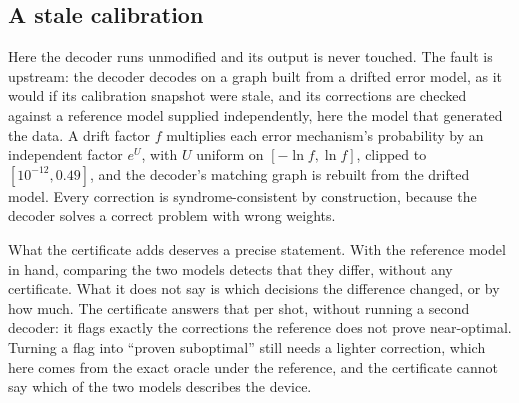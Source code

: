 \documentclass[aps,pra,twocolumn,superscriptaddress,nofootinbib,longbibliography,floatfix]{revtex4-2}
\newcommand{\eps}{\varepsilon}
\begin{document}
\subsection{A stale calibration}

Here the decoder runs unmodified and its output is never touched. The fault is upstream: the decoder decodes on a graph built from a drifted error model, as it would if its calibration snapshot were stale, and its corrections are checked against a reference model supplied independently, here the model that generated the data. A drift factor $f$ multiplies each error mechanism's probability by an independent factor $e^{U}$, with $U$ uniform on $[-\ln f,\ln f]$, clipped to $[10^{-12},0.49]$, and the decoder's matching graph is rebuilt from the drifted model. Every correction is syndrome-consistent by construction, because the decoder solves a correct problem with wrong weights.

What the certificate adds deserves a precise statement. With the reference model in hand, comparing the two models detects that they differ, without any certificate. What it does not say is which decisions the difference changed, or by how much. The certificate answers that per shot, without running a second decoder: it flags exactly the corrections the reference does not prove near-optimal. Turning a flag into ``proven suboptimal'' still needs a lighter correction, which here comes from the exact oracle under the reference, and the certificate cannot say which of the two models describes the device.

\begin{table}[!tbp]
\caption{Stale-calibration fault at drift factor 3.0, judged against the exact optimum under the reference model. Every correction is syndrome-consistent. False alarms are refusals of corrections within $\eps_{\max}$ of optimal. The last three columns count shots on which only the stale decoder, only the reference decoder, or both made a logical error.}
\label{tab:stale}
\small\setlength{\tabcolsep}{3.5pt}

\end{table}
\end{document}
